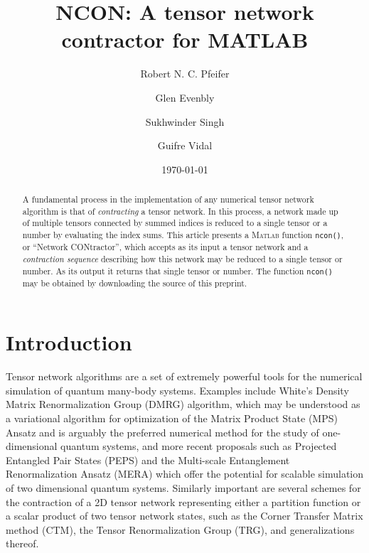 \documentclass[aps,prb,reprint,superscriptaddress,amsmath,amsfonts]{revtex4-1}
\theoremstyle{definition}
\newcommand{\MATLAB}{\textsc{Matlab}}
\newcommand{\ttt}[1]{\texttt{#1}}
\begin{document}
\title{NCON: A tensor network contractor for MATLAB}

\author{Robert N. C. Pfeifer}
\author{Glen Evenbly}
\author{Sukhwinder Singh}
\author{Guifre Vidal}
  \date{\today}

\begin{abstract}
A fundamental process in the implementation of any numerical tensor network algorithm is that of \emph{contracting} a tensor network. In this process, a network made up of multiple tensors connected by summed indices is reduced to a single tensor or a number by evaluating the index sums. This article presents a \MATLAB{} function \ttt{ncon()}, or ``Network CONtractor'', which accepts as its input a tensor network and a \emph{contraction sequence} describing how this network may be reduced to a single tensor or number. As its output it returns that single tensor or number. The function \ttt{ncon()} may be obtained by downloading the source of this preprint.
\end{abstract}

\maketitle

\section{Introduction}

Tensor network algorithms are a set of extremely powerful tools for the numerical simulation of quantum many-body systems. 
Examples include White's Density Matrix Renormalization Group (DMRG) algorithm,\cite{white1992} which may be understood as a variational algorithm for optimization of the Matrix Product State (MPS) Ansatz and is arguably the preferred numerical method for the study of one-dimensional quantum systems, and more recent proposals such as Projected Entangled Pair States (PEPS)\cite{verstraete2004,jordan2008} and the Multi-scale Entanglement Renormalization Ansatz (MERA)\cite{vidal2007,cincio2008,evenbly2009b,vidal2010} which offer the potential for scalable simulation of two dimensional quantum systems.
Similarly important are several schemes for the contraction of a 2D tensor network representing either a partition function or a scalar product of two tensor network states, such as the Corner Transfer Matrix method (CTM),\cite{nishino1997} the Tensor Renormalization Group (TRG),\cite{levin2007} and generalizations thereof.\cite{gu2008,gu2009,zhao2010}
\end{document}
